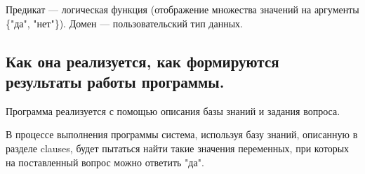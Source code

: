 Предикат --- логическая функция (отображение множества значений на аргументы \{"да", "нет"\}).
Домен --- пользовательский тип данных.

\subsection{Как она реализуется, как формируются результаты работы программы.}

Программа реализуется с помощью описания базы знаний и задания вопроса.

В процессе выполнения программы система, используя базу знаний, описанную в разделе clauses, будет пытаться найти такие значения переменных, при которых на поставленный вопрос можно ответить "да".
